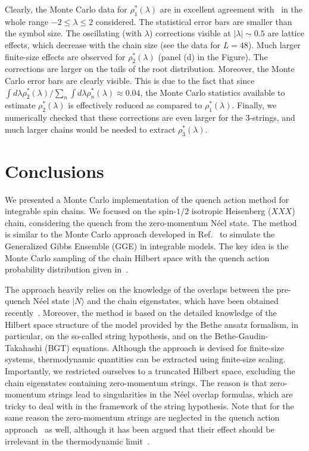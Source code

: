 \documentclass[11pt]{iopart}
\begin{document}
Clearly, the Monte Carlo data for $\rho^*_1(\lambda)$ are in excellent agreement 
with~ in the whole range $-2\le\lambda\le2$ considered. The statistical error 
bars are smaller than the symbol size. The oscillating (with $\lambda$) corrections 
visible at $|\lambda|\sim0.5$ are lattice effects, which decrease with the chain size 
(see the data for $L=48$). Much larger finite-size effects are observed for 
$\rho^*_2(\lambda)$ (panel (d) in the Figure). The corrections are larger on the tails of 
the root distribution. Moreover, the Monte Carlo error bars are clearly visible. This is 
due to the fact that since $\int d\lambda\rho^*_2(\lambda)/\sum_n\int d\lambda
\rho_n^*(\lambda)\approx 0.04$, the Monte Carlo statistics available to estimate 
$\rho_2^*(\lambda)$ is effectively reduced as compared to $\rho_1^*(\lambda)$. 
Finally, we numerically checked that these corrections are even larger for the $3$-strings,  
and much larger chains would be needed to extract $\rho^*_3(\lambda)$. 

\section{Conclusions}
\label{conclusions}

We presented a Monte Carlo implementation of the quench action method for integrable 
spin chains. We focused on the spin-$1/2$ isotropic Heisenberg ($XXX$) chain, considering  
the quench from the zero-momentum N\'eel state. The method is similar to the Monte Carlo 
approach developed in Ref.~\cite{alba-2015} to simulate the Generalized Gibbs Ensemble 
(GGE) in integrable models. The key idea is the Monte Carlo sampling of the chain Hilbert 
space with the quench action probability distribution given in~. 

The approach heavily relies on the knowledge of the overlaps between the pre-quench N\'eel 
state $|N\rangle$ and the chain eigenstates, which have been obtained recently~\cite{
pozsgay-2014,brockmann-2014,brockmann-2014a,brockmann-2014b,brockmann-2014c,piroli-2014}. 
Moreover, the method is based on the detailed knowledge of the Hilbert space 
structure of the model provided by the Bethe ansatz formalism, in particular, on the 
so-called string hypothesis, and on the Bethe-Gaudin-Takahashi (BGT) equations. Although 
the approach is devised for finite-size systems, thermodynamic quantities can be extracted 
using finite-size scaling. Importantly, we restricted ourselves to a truncated Hilbert space, 
excluding the chain eigenstates containing zero-momentum strings. The reason is that 
zero-momentum strings lead to singularities in the N\'eel overlap formulas, which are 
tricky to deal with in the framework of the string hypothesis. Note that for the same 
reason the zero-momentum strings are neglected in the quench action approach~\cite{brockmann-2014} 
as well, although it has been argued that their effect should be irrelevant in the 
thermodynamic limit~\cite{brockmann-2014}. 
\end{document}
